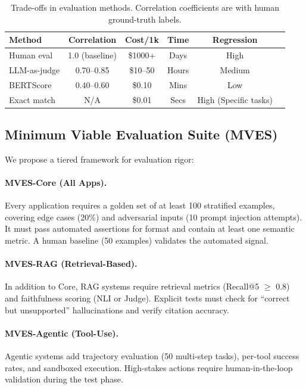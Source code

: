 \begin{table}[h]
\centering
\footnotesize
\caption{Trade-offs in evaluation methods. Correlation coefficients are with human ground-truth labels.}
\label{tab:eval-tradeoffs}
\begin{tabular}{@{}p{2.5cm}ccccc@{}}
\toprule
\textbf{Method} & \textbf{Correlation} & \textbf{Cost/1k} & \textbf{Time} & \textbf{Regression} \\
\midrule
Human eval & 1.0 (baseline) & \$1000+ & Days & High \\
LLM-as-judge & 0.70--0.85 & \$10--50 & Hours & Medium \\
BERTScore & 0.40--0.60 & \$0.10 & Mins & Low \\
Exact match & N/A & \$0.01 & Secs & High (Specific tasks) \\
\bottomrule
\end{tabular}
\end{table}

\subsection{Minimum Viable Evaluation Suite (MVES)}
\label{sec:mves}

We propose a tiered framework for evaluation rigor:

\paragraph{MVES-Core (All Apps).} Every application requires a golden set of at least 100 stratified examples, covering edge cases (20\%) and adversarial inputs (10 prompt injection attempts). It must pass automated assertions for format and contain at least one semantic metric. A human baseline (50 examples) validates the automated signal.

\paragraph{MVES-RAG (Retrieval-Based).} In addition to Core, RAG systems require retrieval metrics (Recall@5 $\geq$ 0.8) and faithfulness scoring (NLI or Judge). Explicit tests must check for ``correct but unsupported'' hallucinations and verify citation accuracy.

\paragraph{MVES-Agentic (Tool-Use).} Agentic systems add trajectory evaluation (50 multi-step tasks), per-tool success rates, and sandboxed execution. High-stakes actions require human-in-the-loop validation during the test phase.
